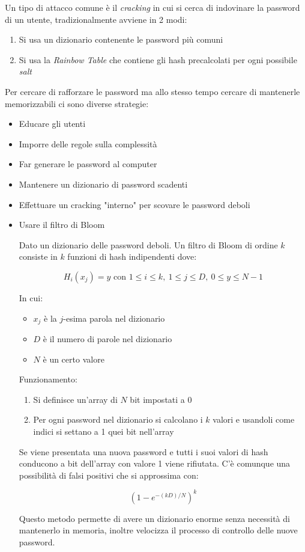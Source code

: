 \documentclass{article}
\begin{document}
\noindent Un tipo di attacco comune è il \textit{cracking} in cui si cerca di indovinare la password di un utente, tradizionalmente avviene in 2 modi:
\begin{enumerate}
    \item Si usa un dizionario contenente le password più comuni
    \item Si usa la \textit{Rainbow Table} che contiene gli hash precalcolati per ogni possibile \textit{salt}\newline
\end{enumerate}

\noindent Per cercare di rafforzare le password ma allo stesso tempo cercare di mantenerle memorizzabili ci sono diverse strategie:
\begin{itemize}
    \item Educare gli utenti
    \item Imporre delle regole sulla complessità
    \item Far generare le password al computer
    \item Mantenere un dizionario di password scadenti
    \item Effettuare un cracking "interno" per scovare le password deboli
    \item Usare il filtro di Bloom\newline

        Dato un dizionario delle password deboli. Un filtro di Bloom di ordine $k$ consiste in $k$ funzioni di hash indipendenti dove:
        
        $$H_i(x_j)=y \text{ con }1\leq i\leq k,\ 1\leq j\leq D,\ 0\leq y\leq N-1 $$

        In cui:
        \begin{itemize}
            \item $x_j$ è la $j$-esima parola nel dizionario
            \item $D$ è il numero di parole nel dizionario
            \item $N$ è un certo valore
        \end{itemize}

        Funzionamento:
        \begin{enumerate}
            \item Si definisce un'array di $N$ bit impostati a 0
            \item Per ogni password nel dizionario si calcolano i $k$ valori e usandoli come indici si settano a 1 quei bit nell'array
        \end{enumerate}

        Se viene presentata una nuova password e tutti i suoi valori di hash conducono a bit dell'array con valore 1 viene rifiutata. C'è comunque una possibilità di falsi positivi che si approssima con:

        $$\left(1-e^{-(kD)/N}\right)^k$$\newline

        Questo metodo permette di avere un dizionario enorme senza necessità di mantenerlo in memoria, inoltre velocizza il processo di controllo delle nuove password.\newline
    
\end{itemize}
\end{document}
